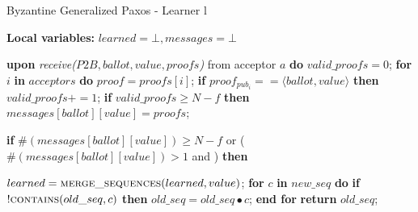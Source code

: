 \begin{algorithm}
	\caption{Byzantine Generalized Paxos - Learner l}
	\label{BFT-Learn}
	\textbf{Local variables:} $learned = \bot, messages = \bot$
	\begin{algorithmic}[1]			
		\State \textbf{upon} \textit{receive($P2B, ballot, value, proofs$)} from acceptor $a$ \textbf{do}
		\State \hspace{\algorithmicindent} $valid\_proofs = 0$;
		\State \hspace{\algorithmicindent} \textbf{for} $i$ \textbf{in} $acceptors$ \textbf{do}
		\State \hspace{\algorithmicindent}\hspace{\algorithmicindent} $proof = proofs[i]$;
		\State \hspace{\algorithmicindent}\hspace{\algorithmicindent} \textbf{if} $proof_{pub_i} == \langle ballot, value \rangle$ \textbf{then}
		\State \hspace{\algorithmicindent}\hspace{\algorithmicindent}\hspace{\algorithmicindent} 
		$valid\_proofs \mathrel{+{=}} 1$;
		\State
		\State \hspace{\algorithmicindent} \textbf{if} $valid\_proofs \geq N-f$ \textbf{then}
		\State \hspace{\algorithmicindent}\hspace{\algorithmicindent} $messages[ballot][value] = proofs$;
		\State
		\State \hspace{\algorithmicindent}\hspace{\algorithmicindent}
		\parbox{\linewidth}{\textbf{if} $\#(messages[ballot][value]) \geq N-f$ or ($\#(messages[ballot][value]) > 1$ and ) \textbf{then}}
		\State \hspace{\algorithmicindent}\hspace{\algorithmicindent}\hspace{\algorithmicindent} $learned = \Call{merge\_sequences}{learned, value}$;
		\State		
		\State \textbf{for} $c$ \textbf{in} $new\_seq$ \textbf{do} 
		\State \hspace{\algorithmicindent} \textbf{if} $!\Call{contains}{old\_seq,c}$ \textbf{then}
		\State \hspace{\algorithmicindent}\hspace{\algorithmicindent}\hspace{\algorithmicindent} $old\_seq =  old\_seq \bullet c$;
		\State \textbf{end for}
		\State \textbf{return} $old\_seq$;
		\EndFunction
	\end{algorithmic}
\end{algorithm}

